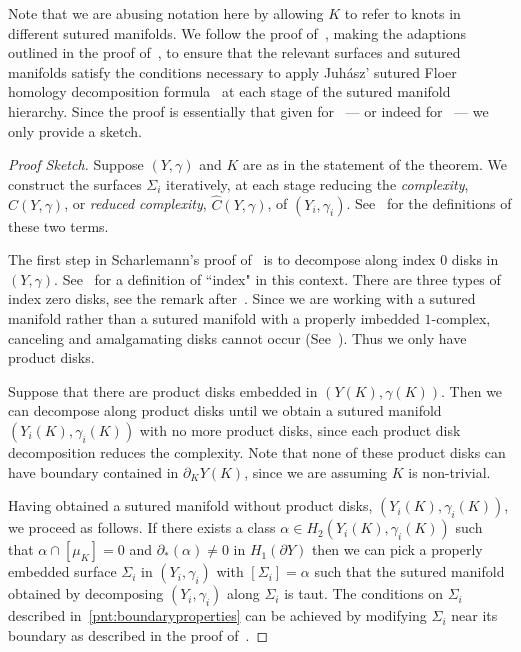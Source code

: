 \documentclass{amsart}
\theoremstyle{definition}
\theoremstyle{remark}
\numberwithin{equation}{section}
\begin{document}
Note that we are abusing notation here by allowing $K$ to refer to knots in different sutured manifolds. 
   We follow the proof of~\cite[Theorem 4.19]{scharlemann1989sutured}, making the adaptions outlined in the proof of~\cite[Theorem 2.9]{li2022floer}, to ensure that the relevant surfaces and sutured manifolds satisfy the conditions necessary to apply Juh\'asz' sutured Floer homology decomposition formula~\cite[Theorem 1.3]{juhasz2008floer} at each stage of the sutured manifold hierarchy. Since the proof is essentially that given for~\cite[Theorem 2.9]{li2022floer} --- or indeed for~\cite[Theorem 4.19]{scharlemann1989sutured} --- we only provide a sketch.
\begin{proof}[Proof Sketch]

Suppose $(Y,\gamma)$ and $K$ are as in the statement of the theorem. We construct the surfaces $\Sigma_i$ iteratively, at each stage reducing the \emph{complexity}, $C(Y,\gamma)$, or \emph{reduced complexity}, $\widehat{C}(Y,\gamma)$, of $(Y_i,\gamma_i)$. See~\cite[Definition 4.11, Definition 4.12]{scharlemann1989sutured} for the definitions of these two terms. 

The first step in Scharlemann's proof of~\cite[Theorem 4.19]{scharlemann1989sutured} is to decompose along index $0$ disks in $(Y,\gamma)$. See~\cite[Definition 4.6]{scharlemann1989sutured} for a definition of ``index" in this context. There are three types of index zero disks, see the remark after~\cite[Definition 4.6]{scharlemann1989sutured}. Since we are working with a sutured manifold rather than a sutured manifold with a properly imbedded $1$-complex, canceling and amalgamating disks cannot occur (See~\cite[Definition 4.1]{scharlemann1989sutured}). Thus we only have product disks.

Suppose that there are product disks embedded in $(Y(K),\gamma(K))$. Then we can decompose along product disks until we obtain a sutured manifold $(Y_i(K),\gamma_i(K))$ with no more product disks, since each product disk decomposition reduces the complexity. Note that none of these product disks can have boundary contained in $\partial_KY(K)$, since we are assuming $K$ is non-trivial.

 Having obtained a sutured manifold without product disks, $(Y_i(K),\gamma_i(K))$, we proceed as follows. If there exists a class $\alpha\in H_2(Y_i(K),\gamma_i(K))$ such that $\alpha\cap[\mu_K]=0$ and $\partial_*(\alpha)\neq 0$ in $H_1(\partial Y)$ then we can pick a properly embedded surface $\Sigma_i$ in $(Y_i,\gamma_i)$ with $[\Sigma_i]=\alpha$ such that the sutured manifold obtained by decomposing $(Y_i,\gamma_i)$ along $\Sigma_i$ is taut. The conditions on $\Sigma_i$ described in~\ref{pnt:boundaryproperties} can be achieved by modifying $\Sigma_i$ near its boundary as described in the proof of~\cite[Theorem 2.9]{li2022floer}.



\end{proof}
\end{document}
